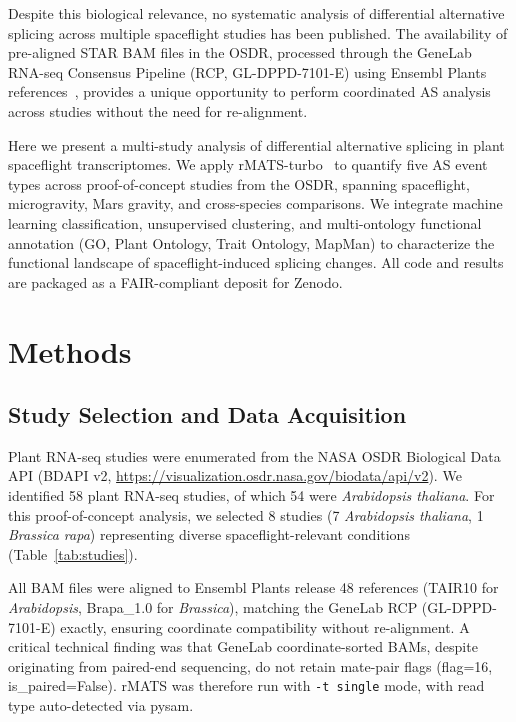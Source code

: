 \documentclass[12pt,a4paper]{article}
\begin{document}
Despite this biological relevance, no systematic analysis of differential alternative splicing across multiple spaceflight studies has been published. The availability of pre-aligned STAR BAM files in the OSDR, processed through the GeneLab RNA-seq Consensus Pipeline (RCP, GL-DPPD-7101-E) using Ensembl Plants references~\cite{genelab_rcp}, provides a unique opportunity to perform coordinated AS analysis across studies without the need for re-alignment.

Here we present a multi-study analysis of differential alternative splicing in plant spaceflight transcriptomes. We apply rMATS-turbo~\cite{rmats_turbo} to quantify five AS event types across proof-of-concept studies from the OSDR, spanning spaceflight, microgravity, Mars gravity, and cross-species comparisons. We integrate machine learning classification, unsupervised clustering, and multi-ontology functional annotation (GO, Plant Ontology, Trait Ontology, MapMan) to characterize the functional landscape of spaceflight-induced splicing changes. All code and results are packaged as a FAIR-compliant deposit for Zenodo.

\section{Methods}

\subsection{Study Selection and Data Acquisition}

Plant RNA-seq studies were enumerated from the NASA OSDR Biological Data API (BDAPI v2, \url{https://visualization.osdr.nasa.gov/biodata/api/v2}). We identified 58 plant RNA-seq studies, of which 54 were \textit{Arabidopsis thaliana}. For this proof-of-concept analysis, we selected 8 studies (7 \textit{Arabidopsis thaliana}, 1 \textit{Brassica rapa}) representing diverse spaceflight-relevant conditions (Table~\ref{tab:studies}).

All BAM files were aligned to Ensembl Plants release 48 references (TAIR10 for \textit{Arabidopsis}, Brapa\_1.0 for \textit{Brassica}), matching the GeneLab RCP (GL-DPPD-7101-E) exactly, ensuring coordinate compatibility without re-alignment. A critical technical finding was that GeneLab coordinate-sorted BAMs, despite originating from paired-end sequencing, do not retain mate-pair flags (flag=16, is\_paired=False). rMATS was therefore run with \texttt{-t single} mode, with read type auto-detected via pysam.
\end{document}
